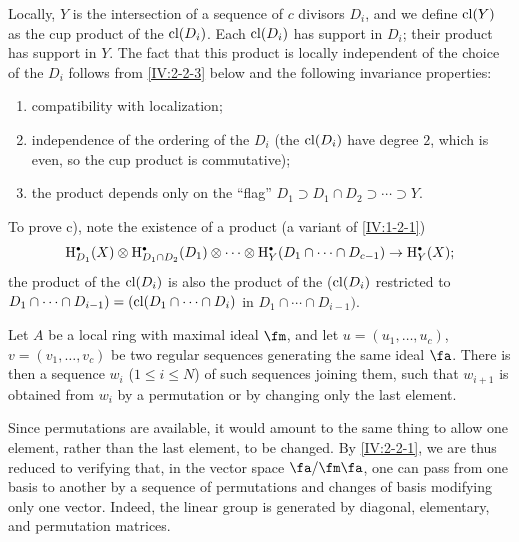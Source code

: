 Locally, $Y$ is the intersection of a sequence of $c$ divisors $D_i$, and we
define $\operatorname{cl}(Y)$ as the cup product of the $\operatorname{cl}(D_i)$. Each $\operatorname{cl}(D_i)$ has
support in $D_i$; their product has support in $Y$. The fact that this product
is locally independent of the choice of the $D_i$ follows from
\ref{IV:2-2-3} below and the following invariance properties:
\begin{enumerate}[\indent a)]
  \item compatibility with localization;
  \item independence of the ordering of the $D_i$ (the $\operatorname{cl}(D_i)$ have
    degree $2$, which is even, so the cup product is commutative);
  \item the product depends only on the ``flag''
    $D_1\supset D_1\cap D_2\supset \cdots\supset Y$.
\end{enumerate}
To prove c), note the existence of a product (a variant of
\ref{IV:1-2-1})
\[
  \h_{D_1}^\bullet(X)\otimes \h_{D_1\cap D_2}^\bullet(D_1)\otimes \cdots \otimes \h_Y^\bullet(D_1\cap \cdots \cap D_{c-1}) \to \h_Y^\bullet(X) \text{;}
\]
the product of the $\operatorname{cl}(D_i)$ is also the product of the
($\operatorname{cl}(D_i)$ restricted to
$D_1\cap \cdots \cap D_{i-1})=(\operatorname{cl}(D_1\cap \cdots \cap D_i)$ in
$D_1\cap \cdots \cap D_{i-1})$.






\begin{lemma}\label{IV:2-2-3}
Let $A$ be a local ring with maximal ideal $\fm$, and let
$u=(u_1,\dots,u_c)$, $v=(v_1,\dots,v_c)$ be two regular sequences generating
the same ideal $\fa$. There is then a sequence $w_i$
($1\leqslant i\leqslant N$) of such sequences joining them, such that
$w_{i+1}$ is obtained from $w_i$ by a permutation or by changing only the
last element.
\end{lemma}

Since permutations are available, it would amount to the same thing to allow
one element, rather than the last element, to be changed. By
\ref{IV:2-2-1}, we are thus reduced to verifying that, in the vector space
$\fa/\fm\fa$, one can pass from one basis to another by a sequence of
permutations and changes of basis modifying only one vector. Indeed, the
linear group is generated by diagonal, elementary, and permutation matrices.






\subsubsection{}\label{IV:2-2-4}

